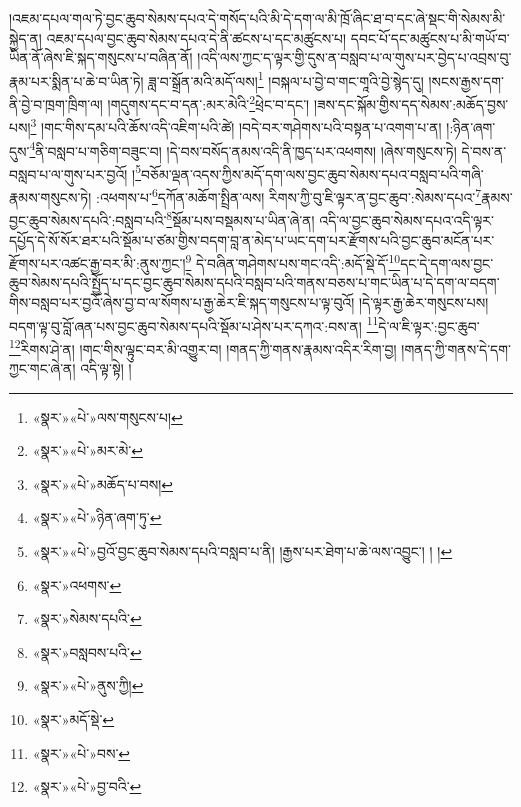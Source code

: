 །འཇམ་དཔལ་གལ་ཏེ་བྱང་ཆུབ་སེམས་དཔའ་དེ་གསོད་པའི་མི་དེ་དག་ལ་མི་ཁྲོ་ཞིང་ཐ་བ་དང་ཞེ་སྡང་གི་སེམས་མི་སྐྱེད་ན། འཇམ་དཔལ་བྱང་ཆུབ་སེམས་དཔའ་དེ་ནི་ཚངས་པ་དང་མཚུངས་པ། དབང་པོ་དང་མཚུངས་པ་མི་གཡོ་བ་ཡིན་ནོ་ཞེས་ཇི་སྐད་གསུངས་པ་བཞིན་ནོ། །འདི་ལས་ཀྱང་ད་ལྟར་གྱི་དུས་ན་བསླབ་པ་ལ་གུས་པར་བྱེད་པ་འབྲས་བུ་རྣམ་པར་སྨིན་པ་ཆེ་བ་ཡིན་ཏེ། ཟླ་བ་སྒྲོན་མའི་མདོ་ལས།\footnote{«སྣར་»«པེ་»ལས་གསུངས་པ།} །བསྐལ་པ་བྱེ་བ་གང་གཱའི་བྱེ་སྙེད་དུ། །སངས་རྒྱས་དག་ནི་བྱེ་བ་ཁྲག་ཁྲིག་ལ། །གདུགས་དང་བ་དན་:མར་མེའི་\footnote{«སྣར་»«པེ་»མར་མེ་}ཕྲེང་བ་དང་། །ཟས་དང་སྐོམ་གྱིས་དད་སེམས་:མཆོད་བྱས་པས།\footnote{«སྣར་»«པེ་»མཆོད་པ་བས།} །གང་གིས་དམ་པའི་ཆོས་འདི་འཇིག་པའི་ཚེ། །བདེ་བར་གཤེགས་པའི་བསྟན་པ་འགག་པ་ན། །:ཉིན་ཞག་དུས་\footnote{«སྣར་»«པེ་»ཉིན་ཞག་ཏུ་}ནི་བསླབ་པ་གཅིག་བཟུང་བ། །དེ་བས་བསོད་ནམས་འདི་ནི་ཁྱད་པར་འཕགས། །ཞེས་གསུངས་ཏེ། དེ་བས་ན་བསླབ་པ་ལ་གུས་པར་བྱའོ། །\footnote{«སྣར་»«པེ་»བྱའོ་བྱང་ཆུབ་སེམས་དཔའི་བསླབ་པ་ནི། །རྒྱས་པར་ཐེག་པ་ཆེ་ལས་འབྱུང་། ། །}བཅོམ་ལྡན་འདས་ཀྱིས་མདོ་དག་ལས་བྱང་ཆུབ་སེམས་དཔའ་བསླབ་པའི་གཞི་རྣམས་གསུངས་ཏེ། :འཕགས་པ་\footnote{«སྣར་»འཕགས་}དཀོན་མཆོག་སྤྲིན་ལས། རིགས་ཀྱི་བུ་ཇི་ལྟར་ན་བྱང་ཆུབ་:སེམས་དཔའ་\footnote{«སྣར་»སེམས་དཔའི་}རྣམས་བྱང་ཆུབ་སེམས་དཔའི་:བསླབ་པའི་\footnote{«སྣར་»བསླབས་པའི་}སྡོམ་པས་བསྡམས་པ་ཡིན་ཞེ་ན། འདི་ལ་བྱང་ཆུབ་སེམས་དཔའ་འདི་ལྟར་དཔྱོད་དེ་སོ་སོར་ཐར་པའི་སྡོམ་པ་ཙམ་གྱིས་བདག་བླ་ན་མེད་པ་ཡང་དག་པར་རྫོགས་པའི་བྱང་ཆུབ་མངོན་པར་རྫོགས་པར་འཚང་རྒྱ་བར་མི་:ནུས་ཀྱང་།\footnote{«སྣར་»«པེ་»ནུས་ཀྱི།} དེ་བཞིན་གཤེགས་པས་གང་འདི་:མདོ་སྡེ་དོ་\footnote{«སྣར་»མདོ་སྡེ་}དང་དེ་དག་ལས་བྱང་ཆུབ་སེམས་དཔའི་སྤྱོད་པ་དང་བྱང་ཆུབ་སེམས་དཔའི་བསླབ་པའི་གནས་བཅས་པ་གང་ཡིན་པ་དེ་དག་ལ་བདག་གིས་བསླབ་པར་བྱའོ་ཞེས་བྱ་བ་ལ་སོགས་པ་རྒྱ་ཆེར་ཇི་སྐད་གསུངས་པ་ལྟ་བུའོ། །དེ་ལྟར་རྒྱ་ཆེར་གསུངས་པས། བདག་ལྟ་བུ་བློ་ཞན་པས་བྱང་ཆུབ་སེམས་དཔའི་སྡོམ་པ་ཤེས་པར་དཀའ་:བས་ན། \footnote{«སྣར་»«པེ་»བས་}དེ་ལ་ཇི་ལྟར་:བྱང་ཆུབ་\footnote{«སྣར་»«པེ་»བྱ་བའི་}རིགས་ཤེ་ན། །གང་གིས་ལྟུང་བར་མི་འགྱུར་བ། །གནད་ཀྱི་གནས་རྣམས་འདིར་རིག་བྱ། །གནད་ཀྱི་གནས་དེ་དག་ཀྱང་གང་ཞེ་ན། འདི་ལྟ་སྟེ། །
